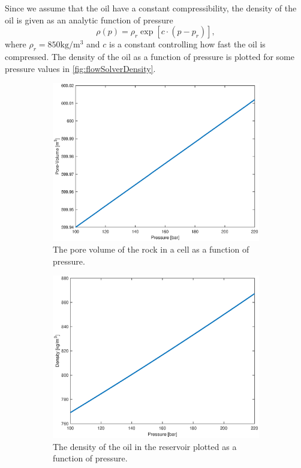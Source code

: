 Since we assume that the oil have a constant compressibility, the density of the oil is given as an analytic function of pressure 
\begin{equation}
    \rho(p) = \rho_r\exp[c\cdot(p-p_r)],
    \label{eq:pressureSolverDensity}
\end{equation}
where $\rho_r = 850\text{kg}/\text{m}^3$ and $c$ is a constant controlling how fast the oil is compressed. The density of the oil as a function of pressure is plotted for some pressure values in \autoref{fig:flowSolverDensity}.
\begin{figure}[H]
    \centering
    \begin{subfigure}[t]{0.48\textwidth}
        \includegraphics[width=\textwidth]{figures/flow_solver_pore-volume.eps}
        \caption{The pore volume of the rock in a cell as a function of pressure.}
        \label{fig:flowSolverPoreVolume}
        
    \end{subfigure}
    \begin{subfigure}[t]{0.48\textwidth}
        \includegraphics[width=\textwidth]{figures/flow_solver_density.eps}
        \caption{The density of the oil in the reservoir plotted as a function of pressure.}
        \label{fig:flowSolverDensity}
    \end{subfigure}
    \caption{}
\end{figure}


